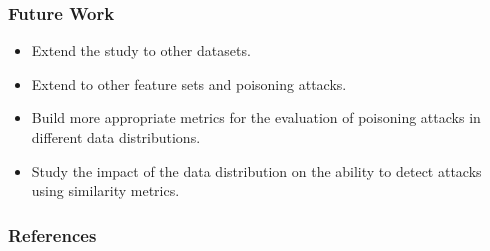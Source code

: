 \documentclass[color,t,presentation,english,aspectratio=169]{beamer}
\begin{document}
\begin{frame}
	\frametitle{Future Work}
	\begin{itemize}
		\item Extend the study to other datasets. \only<2>{\textcolor{red}{[DONE]}}
		\item Extend to other feature sets and poisoning attacks.
		\item Build more appropriate metrics for the evaluation of poisoning attacks in different data distributions.
		\item Study the impact of the data distribution on the ability to detect attacks using similarity metrics. \only<2>{\textcolor{red}{[DONE]}}
	\end{itemize}

\end{frame}

\begin{frame}[allowframebreaks]
	\frametitle{References}
	\printbibliography
\end{frame}
\end{document}
